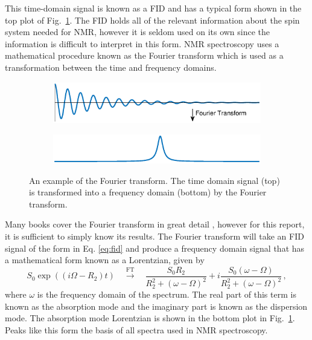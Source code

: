 This time-domain signal is known as a \ac{FID} and has a typical form shown in the top plot of Fig.\ \ref{fig:fft}. 
The \ac{FID} holds all of the relevant information about the spin system needed for \ac{NMR}, however it is seldom used on its own since the information is difficult to interpret in this form.
\ac{NMR} spectroscopy uses a mathematical procedure known as the Fourier transform which is used as a transformation between the time and frequency domains. 
\begin{figure}
	\centering
	\begin{subfigure}{\textwidth}
		\includegraphics[width=\textwidth]{figures/background/FID.eps}
	\end{subfigure}

	\begin{subfigure}{\textwidth}
		\includegraphics[width=\textwidth]{figures/background/fftFID.eps}
	\end{subfigure}
	\caption{An example of the Fourier transform. The time domain signal (top) is transformed into a frequency domain (bottom) by the Fourier transform. }
	\label{fig:fft}

      \end{figure}
      
Many books cover the Fourier transform in great detail \cite{Keeler2010, Haacke1999}, however for this report, it is sufficient to simply know its results.
The Fourier transform will take an \ac{FID} signal of the form in Eq. \ref{eq:fid} and produce a frequency domain signal that has a mathematical form known as a Lorentzian, given by 
\begin{equation}
	S_0\exp((i\Omega - R_2)t) \quad\overset{\mathrm{FT}}{\rightarrow}\quad \frac{S_0R_2}{R_2^2 + (\omega - \Omega)^2} + i\frac{S_0(\omega - \Omega)}{R_2^2 + (\omega - \Omega)^2}\,,
\end{equation}    
where $\omega$ is the frequency domain of the spectrum. 
The real part of this term is known as the absorption mode and the imaginary part is known as the dispersion mode.
The absorption mode Lorentzian is shown in the bottom plot in Fig.\ \ref{fig:fft}. 
Peaks like this form the basis of all spectra used in \ac{NMR} spectroscopy. 



